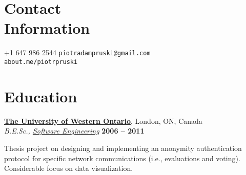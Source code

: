 \documentclass[margin,line]{resume}
\begin{document}
\begin{resume}

\section{\mysidestyle Contact\\Information}

	+1 647 986 2544	\hfill \texttt{piotradampruski@gmail.com}	\vspace{0mm}\\\vspace{0mm}
			\hfill \texttt{about.me/piotrpruski}		\vspace{0mm}\\\vspace{-4.5mm}



\section{\mysidestyle Education}

	\textbf{\href{http://www.uwo.ca/}{The University of Western Ontario}}, London, ON, Canada	\vspace{2mm}\\\vspace{1mm}
	\textsl{B.E.Sc., \href{http://www.eng.uwo.ca/undergraduate/programs/Software.html}{Software Engineering}}	\hfill \textbf{ 2006 -- 2011}\vspace{-3mm}\\\vspace{-1mm}
	\begin{list2}
		\item Thesis project on designing and implementing an anonymity authentication protocol for specific network communications (i.e., evaluations and voting). Considerable focus on data visualization.
	\end{list2}\vspace{-1.5mm}


\end{resume}
\end{document}
